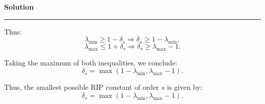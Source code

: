 \documentclass[a4paper,12pt]{article}
\newenvironment{solution}[2][]{%
    \begin{mdframed}[linecolor=blue!70!black, linewidth=2pt, roundcorner=10pt, backgroundcolor=yellow!10!white, skipabove=12pt, skipbelow=12pt]%
        \textbf{\large #2}
        \par\noindent\rule{\textwidth}{0.4pt}
}{
    \end{mdframed}
}
\begin{document}
\begin{solution}{Solution}
Thus:
\begin{equation}
    \lambda_{\min} \geq 1 - \delta_s \Rightarrow \delta_s \geq 1 - \lambda_{\min},
\end{equation}
\begin{equation}
    \lambda_{\max} \leq 1 + \delta_s \Rightarrow \delta_s \geq \lambda_{\max} - 1.
\end{equation}
  
Taking the maximum of both inequalities, we conclude:
\begin{equation}
    \delta_s = \max(1 - \lambda_{\min}, \lambda_{\max} - 1).
\end{equation}
  
Thus, the smallest possible RIP constant of order $s$ is given by:
\begin{equation}
    \delta_s = \max(1 - \lambda_{\min}, \lambda_{\max} - 1).
\end{equation}

\end{solution}
\end{document}
